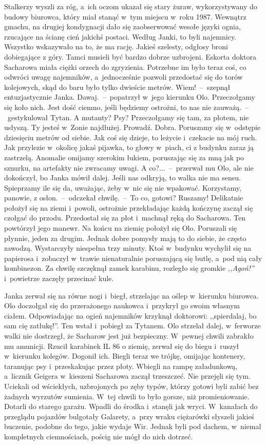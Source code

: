 \documentclass[../MAIN.tex]{subfiles}
\begin{document}
Stalkerzy wyszli za róg, a~ich oczom ukazał się stary żuraw, wykorzystywany do budowy biurowca, który miał stanąć w~tym miejscu w~roku 1987. Wewnątrz gmachu, na drugiej kondygnacji dało się zaobserwować wesołe języki ognia, rzucające na ścianę cień jakichś postaci. Według Janki, to byli najemnicy. Wszystko wskazywało na to, że ma rację. Jakieś szelesty, odgłosy broni dobiegające z góry. Tamci musieli być bardzo dobrze uzbrojeni. Eskorta doktora Sacharowa miała ciężki orzech do zgryzienia. Potrzebne im było teraz coś, co odwróci uwagę najemników, a~jednocześnie pozwoli przedostać się do torów kolejowych, skąd do baru było tylko dwieście metrów.
\sx Wiem!~--~szepnął entuzjastycznie Janka.
\xx Dawaj.~--~popatrzył w~jego kierunku Olo.
\xx Przeczołgamy się koło nich. Jest dość ciemno, jeśli będziemy ostrożni, to nas nie zauważą.~--~gestykulował Tytan.
\xx A mutanty?
\xx Psy? Przeczołgamy się tam, za płotem, nie usłyszą.
\xx Ty jesteś w~Zonie najdłużej. Prowadź.
\xx Dobra. Poruszamy się w~odstępie dziesięciu metrów od siebie. Jak coś się dzieje, to leżycie i~czekacie na mój ruch. Jak przylezie w~okolicę jakaś pijawka, to głowy w~piach, ci z budynku zaraz ją zastrzelą. Anomalie omijamy szerokim łukiem, poruszając się za mną jak po sznurku, na artefakty nie zwracamy uwagi.
\xx A co?...~--~przerwał mu Olo, ale nie dokończył, bo Janka mówił dalej.
\xx Jeśli nas odkryją, to walka nie ma sensu. Spieprzamy ile się da, uważając, żeby w~nic się nie wpakować. Korzystamy, panowie, z osłon.~--~odczekał chwilę.~--~To co, gotowi? Ruszamy!
\qm
Delikatnie położył się na ziemi i~powoli, ostrożnie przekładając każdą kończynę zaczął się czołgać do przodu. Przedostał się za płot i~machnął ręką do Sacharowa. Ten powtórzył jego manewr. Na końcu na ziemię położył się Olo. Poruszali się płynnie, jeden za drugim. Jednak dobre pomysły mają to do siebie, że często zawodzą. Wystarczyły niespełna trzy minuty. Ktoś w~budynku wychylił się na papierosa i~zobaczył w~trawie nienaturalnie poruszającą się butlę, a~pod nią cały kombinezon. Za chwilę szczęknął zamek karabinu, rozległo się gromkie \textit{,,Agoń!'' }i~powietrze zaczęły przecinać kule.

Janka zerwał się na równe nogi i~biegł, strzelając na oślep w~kierunku biurowca. Olo doczołgał się do przerażonego naukowca i~przykrył go swoim własnym ciałem. Odpowiadając na ogień najemników krzyknął doktorowi: ,,spierdalaj, bo sam cię zatłukę!''. Ten wstał i~pobiegł za Tytanem. Olo strzelał dalej, w~ferworze walki nie dostrzegł, że Sacharow jest już bezpieczny. W~pewnej chwili zabrakło mu amunicji. Rzucił karabinek IL 86 o ziemię, zerwał się do biegu i~ruszył w~kierunku kolegów. Dogonił ich. Biegli teraz we trójkę, omijając kontenery, taranując psy i~przeskakując przez płoty. Wbiegli na rampę załadunkową, a~licznik Geigera w~kieszeni Sacharowa zaczął trzeszczeć. Nie przejęli się tym. Uciekali od wściekłych, uzbrojonych po zęby typów, którzy gotowi byli zabić bez żadnych wyrzutów sumienia. W~tej chwili to było gorsze, niż promieniowanie. Dotarli do starego garażu. Wpadli do środka i~stanęli jak wryci. W~kanałach do przeglądu pojazdów bulgotały Galarety, a~przy wraku ciężarówki słyszeli jakieś buczenie,
podobne do tego, jakie wydaje Wir. Jednak byli pod dachem, w~niemal kompletnych ciemnościach, pościg nie mógł do nich dotrzeć.
\end{document}
